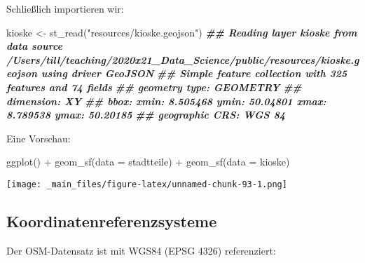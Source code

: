 \documentclass[11pt,german,a4paper]{article}
\newenvironment{Shaded}{\begin{snugshade}}{\end{snugshade}}
\newcommand{\AttributeTok}[1]{\textcolor[rgb]{0.77,0.63,0.00}{#1}}
\newcommand{\DocumentationTok}[1]{\textcolor[rgb]{0.56,0.35,0.01}{\textbf{\textit{#1}}}}
\newcommand{\FunctionTok}[1]{\textcolor[rgb]{0.00,0.00,0.00}{#1}}
\newcommand{\NormalTok}[1]{#1}
\newcommand{\OtherTok}[1]{\textcolor[rgb]{0.56,0.35,0.01}{#1}}
\newcommand{\SpecialCharTok}[1]{\textcolor[rgb]{0.00,0.00,0.00}{#1}}
\newcommand{\StringTok}[1]{\textcolor[rgb]{0.31,0.60,0.02}{#1}}
\begin{document}
Schließlich importieren wir:

\begin{Shaded}
\begin{Highlighting}[]
\NormalTok{kioske }\OtherTok{\textless{}{-}} \FunctionTok{st\_read}\NormalTok{(}\StringTok{"resources/kioske.geojson"}\NormalTok{)}
\DocumentationTok{\#\# Reading layer \textasciigrave{}kioske\textquotesingle{} from data source \textasciigrave{}/Users/till/teaching/2020x21\_Data\_Science/public/resources/kioske.geojson\textquotesingle{} using driver \textasciigrave{}GeoJSON\textquotesingle{}}
\DocumentationTok{\#\# Simple feature collection with 325 features and 74 fields}
\DocumentationTok{\#\# geometry type:  GEOMETRY}
\DocumentationTok{\#\# dimension:      XY}
\DocumentationTok{\#\# bbox:           xmin: 8.505468 ymin: 50.04801 xmax: 8.789538 ymax: 50.20185}
\DocumentationTok{\#\# geographic CRS: WGS 84}
\end{Highlighting}
\end{Shaded}

Eine Vorschau:

\begin{Shaded}
\begin{Highlighting}[]
\FunctionTok{ggplot}\NormalTok{() }\SpecialCharTok{+}
  \FunctionTok{geom\_sf}\NormalTok{(}\AttributeTok{data =}\NormalTok{ stadtteile) }\SpecialCharTok{+}
  \FunctionTok{geom\_sf}\NormalTok{(}\AttributeTok{data =}\NormalTok{ kioske)}
\end{Highlighting}
\end{Shaded}

\texttt{[image: \_main\_files/figure-latex/unnamed-chunk-93-1.png]}

\hypertarget{koordinatenreferenzsysteme}{%
\subsection{Koordinatenreferenzsysteme}\label{koordinatenreferenzsysteme}}

Der OSM-Datensatz ist mit WGS84 (EPSG 4326) referenziert:
\end{document}
